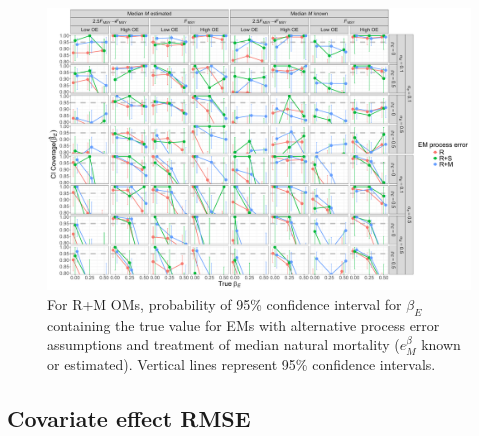 \documentclass[
  12pt,
]{article}
\begin{document}
\begin{landscape}
\begin{figure}
\begin{center}
\includegraphics[height = \textheight]{beta_E_CI_coverage_RMom}
\end{center}
\caption{For R+M OMs, probability of 95\% confidence interval for $\beta_E$ containing the true value for EMs with alternative process error assumptions and treatment of median natural mortality ($e^\beta_M$ known or estimated). Vertical lines represent 95\% confidence intervals.}\label{beta_E_CI_coverage_RMom}
\end{figure}
\end{landscape}

\hypertarget{covariate-effect-rmse}{%
\subsection*{Covariate effect RMSE}\label{covariate-effect-rmse}}
\end{document}
